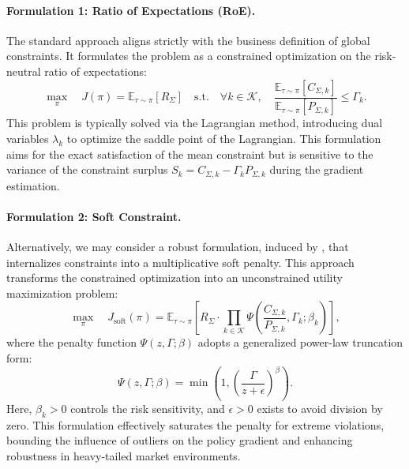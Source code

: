 \documentclass[sigconf, anonymous, review]{acmart}
\begin{document}
\paragraph{Formulation 1: Ratio of Expectations (RoE).}
The standard approach aligns strictly with the business definition of global constraints. It formulates the problem as a constrained optimization on the risk-neutral ratio of expectations:
\begin{equation}
\label{eq:optimization_target_roe_app}
    \max_{\pi} \quad J(\pi) = \mathbb{E}_{\tau \sim \pi} \left[ R_{\Sigma} \right] \quad \text{s.t.} \quad \forall k \in \mathcal{K}, \quad \frac{\mathbb{E}_{\tau \sim \pi}[C_{\Sigma, k}]}{\mathbb{E}_{\tau \sim \pi}[P_{\Sigma, k}]} \le \Gamma_k.
\end{equation}
This problem is typically solved via the Lagrangian method, introducing dual variables $\lambda_k$ to optimize the saddle point of the Lagrangian. This formulation aims for the exact satisfaction of the mean constraint but is sensitive to the variance of the constraint surplus $S_k = C_{\Sigma, k} - \Gamma_k P_{\Sigma, k}$ during the gradient estimation.

\paragraph{Formulation 2: Soft Constraint.}
Alternatively, we may consider a robust formulation, induced by \cite{auction_net}, that internalizes constraints into a multiplicative soft penalty. This approach transforms the constrained optimization into an unconstrained utility maximization problem:
\begin{equation}
\label{eq:optimization_target_soft_app}
    \max_{\pi} \quad J_{\mathrm{soft}}(\pi) = \mathbb{E}_{\tau \sim \pi} \left[ R_{\Sigma} \cdot \prod_{k \in \mathcal{K}} \Psi\left( \frac{C_{\Sigma, k}}{P_{\Sigma, k}}, \Gamma_k; \beta_k \right) \right],
\end{equation}
where the penalty function $\Psi(z, \Gamma; \beta)$ adopts a generalized power-law truncation form:
\begin{equation}
    \Psi(z, \Gamma; \beta) = \min\left(1, \left(\frac{\Gamma}{z + \epsilon}\right)^{\beta}\right).
\end{equation}
Here, $\beta_k > 0$ controls the risk sensitivity, and $\epsilon>0$ exists to avoid division by zero. This formulation effectively saturates the penalty for extreme violations, bounding the influence of outliers on the policy gradient and enhancing robustness in heavy-tailed market environments.
\end{document}
